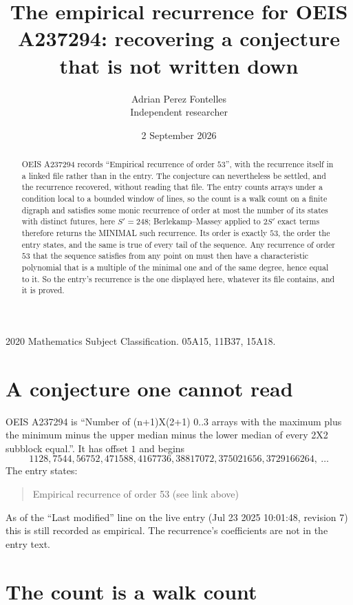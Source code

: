 \documentclass[11pt,a4paper]{article}
\title{The empirical recurrence for OEIS A237294: recovering a conjecture that is not written down}
\author{Adrian Perez Fontelles\\ \small Independent researcher}
\date{2 September 2026}
\theoremstyle{plain}
\theoremstyle{definition}
\begin{document}
\maketitle

\begin{abstract}
OEIS A237294 records ``Empirical recurrence of order $53$'', with the recurrence itself in a
linked file rather than in the entry. The conjecture can nevertheless be settled, and the
recurrence recovered, without reading that file. The entry counts arrays under a condition
local to a bounded window of lines, so the count is a walk count on a finite digraph and
satisfies some monic recurrence of order at most the number of its states with distinct
futures, here $S'=248$; Berlekamp--Massey applied to $2S'$ exact
terms therefore returns the MINIMAL such recurrence. Its order is exactly $53$, the order
the entry states, and the same is true of every tail of the sequence. Any recurrence of order
$53$ that the sequence satisfies from any point on must then have a characteristic
polynomial that is a multiple of the minimal one and of the same degree, hence equal to it. So
the entry's recurrence is the one displayed here, whatever its file contains, and it is
proved.
\end{abstract}

\noindent\small 2020 Mathematics Subject Classification. 05A15, 11B37, 15A18.\normalsize

\section{A conjecture one cannot read}

OEIS A237294 is ``Number of (n+1)X(2+1) 0..3 arrays with the maximum plus the minimum minus the upper median minus the lower median of every 2X2 subblock equal.''. It has offset $1$ and begins
\[
1128, 7544, 56752, 471588, 4167736, 38817072, 375021656, 3729166264,\ \dots
\]
The entry states:
\begin{quote}
Empirical recurrence of order 53 (see link above)
\end{quote}
As of the ``Last modified'' line on the live entry (Jul 23 2025 10:01:48, revision 7) this is still
recorded as empirical. The recurrence's coefficients are not in the entry text.

\section{The count is a walk count}
\end{document}
